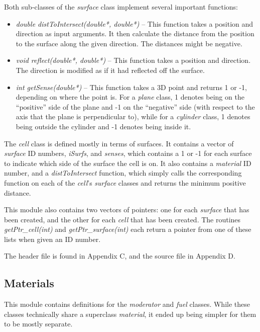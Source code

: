 Both sub-classes of the \textit{surface} class implement several important functions:

\begin{itemize}
\item \textit{double distToIntersect(double*, double*)} -- This function takes a position and direction as input arguments.  It then calculate the distance from the position to the surface along the given direction.  The distances might be negative.
\item \textit{void reflect(double*, double*)} -- This function takes a position and direction.  The direction is modified as if it had reflected off the surface.
\item \textit{int getSense(double*)} -- This function takes a 3D point and returns 1 or -1, depending on where the point is.  For a \textit{plane} class, 1 denotes being on the ``positive'' side of the plane and -1 on the ``negative'' side (with respect to the axis that the plane is perpendicular to), while for a \textit{cylinder} class, 1 denotes being outside the cylinder and -1 denotes being inside it.
\end{itemize}

The \textit{cell} class is defined mostly in terms of surfaces.  It contains a vector of \textit{surface} ID numbers, \textit{iSurfs}, and \textit{senses}, which contains a 1 or -1 for each surface to indicate which side of the surface the cell is on.  It also contains a \textit{material} ID number, and a \textit{distToIntersect} function, which simply calls the corresponding function on each of the \textit{cell}'s \textit{surface} classes and returns the minimum positive distance.

This module also contains two vectors of pointers: one for each \textit{surface} that has been created, and the other for each \textit{cell} that has been created.  The routines \textit{getPtr{\_}cell(int)} and \textit{getPtr{\_}surface(int)} each return a pointer from one of these lists when given an ID number.

The header file is found in Appendix C, and the source file in Appendix D.

\subsection{Materials}\label{ss:materials}

This module contains definitions for the \textit{moderator} and \textit{fuel} classes.  While these classes technically share a superclass \textit{material}, it ended up being simpler for them to be mostly separate.


